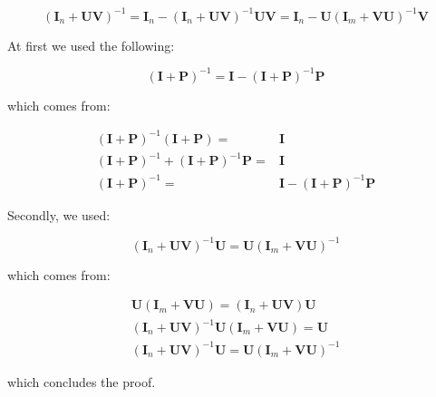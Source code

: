 \documentclass{article}
\begin{document}
\begin{appendices}
\[
(\bm{I}_n + \bm{U}\bm{V})^{-1} = \bm{I}_n - (\bm{I}_n + \bm{U}\bm{V})^{-1}\bm{U}\bm{V} = \bm{I}_n - \bm{U}(\bm{I}_m + \bm{V}\bm{U})^{-1}\bm{V}
\]

At first we used the following:

\[
(\bm{I} + \bm{P})^{-1} = \bm{I} - (\bm{I} + \bm{P})^{-1} \bm{P}
\]

which comes from:

\[
\begin{split}
(\bm{I} + \bm{P})^{-1}(\bm{I} + \bm{P}) =& \bm{I}\\
(\bm{I} + \bm{P})^{-1} + (\bm{I} + \bm{P})^{-1} \bm{P} =& \bm{I}\\
(\bm{I} + \bm{P})^{-1} =& \bm{I} - (\bm{I} + \bm{P})^{-1} \bm{P}
\end{split}
\]

Secondly, we used:

\[
(\bm{I}_n+\bm{U}\bm{V})^{-1}\bm{U} = \bm{U}(\bm{I}_m+\bm{V}\bm{U})^{-1}
\]

which comes from:

\[
\begin{split}
    \bm{U}(\bm{I}_m + \bm{V}\bm{U}) = (\bm{I}_n + \bm{U}\bm{V})\bm{U}\\
    (\bm{I}_n + \bm{U}\bm{V})^{-1}\bm{U}(\bm{I}_m+\bm{V}\bm{U}) = \bm{U}\\
    (\bm{I}_n+\bm{U}\bm{V})^{-1}\bm{U} = \bm{U}(\bm{I}_m+\bm{V}\bm{U})^{-1}
\end{split}
\]

which concludes the proof.

\end{appendices}
\end{document}
